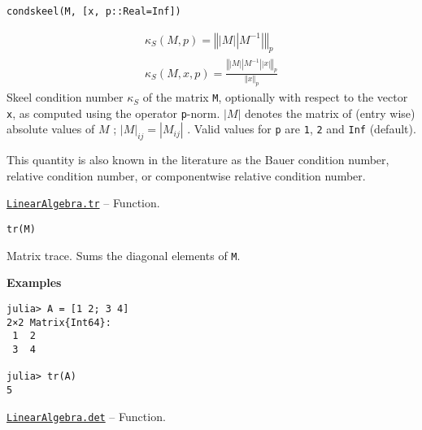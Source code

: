 \begin{adjustwidth}{2em}{0pt}


\begin{verbatim}
condskeel(M, [x, p::Real=Inf])
\end{verbatim}

\begin{equation*}
\begin{split}\kappa_S(M, p) = \left\Vert \left\vert M \right\vert \left\vert M^{-1} \right\vert \right\Vert_p \\
\kappa_S(M, x, p) = \frac{\left\Vert \left\vert M \right\vert \left\vert M^{-1} \right\vert \left\vert x \right\vert \right\Vert_p}{\left \Vert x \right \Vert_p}\end{split}\end{equation*}
Skeel condition number  \(\kappa_S\)  of the matrix \texttt{M}, optionally with respect to the vector \texttt{x}, as computed using the operator \texttt{p}-norm.  \(\left\vert M \right\vert\)  denotes the matrix of (entry wise) absolute values of  \(M\) ;  \(\left\vert M \right\vert_{ij} = \left\vert M_{ij} \right\vert\) . Valid values for \texttt{p} are \texttt{1}, \texttt{2} and \texttt{Inf} (default).

This quantity is also known in the literature as the Bauer condition number, relative condition number, or componentwise relative condition number.



\end{adjustwidth}
\hypertarget{3355659645971312171}{}
\hyperlink{3355659645971312171}{\texttt{LinearAlgebra.tr}}  -- {Function.}

\begin{adjustwidth}{2em}{0pt}


\begin{verbatim}
tr(M)
\end{verbatim}

Matrix trace. Sums the diagonal elements of \texttt{M}.

\textbf{Examples}


\begin{verbatim}
julia> A = [1 2; 3 4]
2×2 Matrix{Int64}:
 1  2
 3  4

julia> tr(A)
5
\end{verbatim}



\end{adjustwidth}
\hypertarget{16543378577000914469}{}
\hyperlink{16543378577000914469}{\texttt{LinearAlgebra.det}}  -- {Function.}

